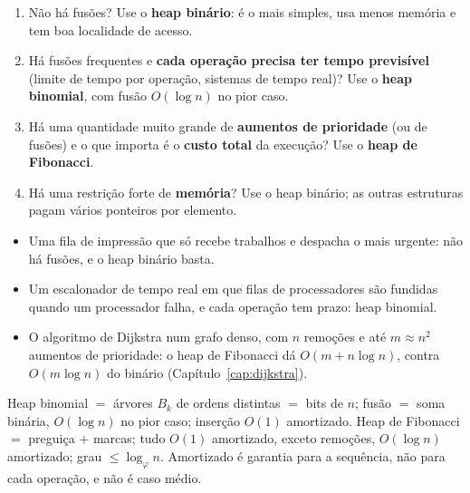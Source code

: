 \begin{roteiro}
\begin{enumerate}
  \item Não há fusões? Use o \textbf{heap binário}: é o mais simples, usa menos memória e tem boa localidade de acesso.
  \item Há fusões frequentes e \textbf{cada operação precisa ter tempo previsível} (limite de tempo por operação, sistemas de tempo real)? Use o \textbf{heap binomial}, com fusão $O(\log n)$ no pior caso.
  \item Há uma quantidade muito grande de \textbf{aumentos de prioridade} (ou de fusões) e o que importa é o \textbf{custo total} da execução? Use o \textbf{heap de Fibonacci}.
  \item Há uma restrição forte de \textbf{memória}? Use o heap binário; as outras estruturas pagam vários ponteiros por elemento.
\end{enumerate}
\end{roteiro}

\begin{exemplo}\leavevmode
\begin{itemize}
  \item Uma fila de impressão que só recebe trabalhos e despacha o mais urgente: não há fusões, e o heap binário basta.
  \item Um escalonador de tempo real em que filas de processadores são fundidas quando um processador falha, e cada operação tem prazo: heap binomial.
  \item O algoritmo de Dijkstra num grafo denso, com $n$ remoções e até $m\approx n^2$ aumentos de prioridade: o heap de Fibonacci dá $O(m+n\log n)$, contra $O(m\log n)$ do binário (Capítulo~\ref{cap:dijkstra}).
\end{itemize}
\end{exemplo}

\begin{chave}
Heap binomial $=$ árvores $B_k$ de ordens distintas $=$ bits de $n$; fusão $=$ soma binária, $O(\log n)$ no pior caso; inserção $O(1)$ amortizado. Heap de Fibonacci $=$ preguiça $+$ marcas; tudo $O(1)$ amortizado, exceto remoções, $O(\log n)$ amortizado; grau $\le\log_\varphi n$. Amortizado é garantia para a sequência, não para cada operação, e não é caso médio.
\end{chave}

